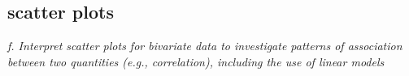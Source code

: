 \subsection[short]{scatter plots}

\textit{f. Interpret scatter plots for bivariate data to investigate patterns of association between two quantities (e.g., correlation), including the use of linear models}

\vspace{.5cm}